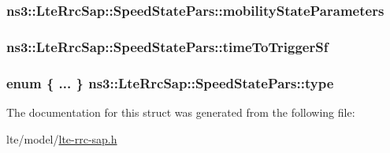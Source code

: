 \subsubsection[{\texorpdfstring{mobility\+State\+Parameters}{mobilityStateParameters}}]{ ns3\+::\+Lte\+Rrc\+Sap\+::\+Speed\+State\+Pars\+::mobility\+State\+Parameters}\hypertarget{structns3_1_1LteRrcSap_1_1SpeedStatePars_ab144bfe25ab6796d165b5a03e95469ab}{}\label{structns3_1_1LteRrcSap_1_1SpeedStatePars_ab144bfe25ab6796d165b5a03e95469ab}
\subsubsection[{\texorpdfstring{time\+To\+Trigger\+Sf}{timeToTriggerSf}}]{ ns3\+::\+Lte\+Rrc\+Sap\+::\+Speed\+State\+Pars\+::time\+To\+Trigger\+Sf}\hypertarget{structns3_1_1LteRrcSap_1_1SpeedStatePars_a4282b6d7164129b5d5375083eae4f22d}{}\label{structns3_1_1LteRrcSap_1_1SpeedStatePars_a4282b6d7164129b5d5375083eae4f22d}
\subsubsection[{\texorpdfstring{type}{type}}]{\setlength{\rightskip}{0pt plus 5cm}enum \{ ... \}   ns3\+::\+Lte\+Rrc\+Sap\+::\+Speed\+State\+Pars\+::type}\hypertarget{structns3_1_1LteRrcSap_1_1SpeedStatePars_aafe0022dde3c79068f8462ef0e7952e3}{}\label{structns3_1_1LteRrcSap_1_1SpeedStatePars_aafe0022dde3c79068f8462ef0e7952e3}


The documentation for this struct was generated from the following file\+:\begin{DoxyCompactItemize}
\item 
lte/model/\hyperlink{lte-rrc-sap_8h}{lte-\/rrc-\/sap.\+h}\end{DoxyCompactItemize}

